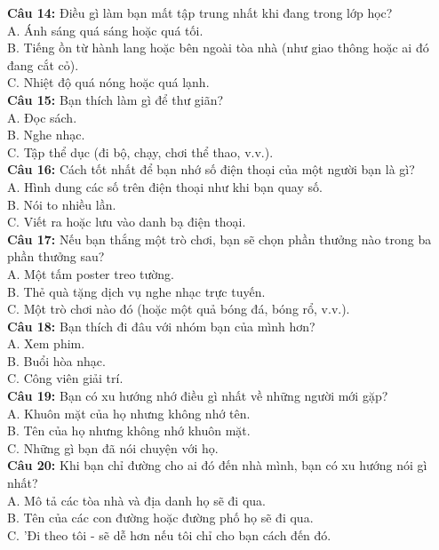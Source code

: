 \begin{multicols}{2}
\textbf{Câu 14:} Điều gì làm bạn mất tập trung nhất khi đang trong lớp học? \\
A. Ánh sáng quá sáng hoặc quá tối. \\
B. Tiếng ồn từ hành lang hoặc bên ngoài tòa nhà (như giao thông hoặc ai đó đang cắt cỏ). \\
C. Nhiệt độ quá nóng hoặc quá lạnh. \\

\textbf{Câu 15:} Bạn thích làm gì để thư giãn? \\
A. Đọc sách. \\
B. Nghe nhạc. \\
C. Tập thể dục (đi bộ, chạy, chơi thể thao, v.v.). \\

\textbf{Câu 16:} Cách tốt nhất để bạn nhớ số điện thoại của một người bạn là gì? \\
A. Hình dung các số trên điện thoại như khi bạn quay số. \\
B. Nói to nhiều lần. \\
C. Viết ra hoặc lưu vào danh bạ điện thoại. \\

\textbf{Câu 17:} Nếu bạn thắng một trò chơi, bạn sẽ chọn phần thưởng nào trong ba phần thưởng sau? \\
A. Một tấm poster treo tường. \\
B. Thẻ quà tặng dịch vụ nghe nhạc trực tuyến. \\
C. Một trò chơi nào đó (hoặc một quả bóng đá, bóng rổ, v.v.). \\

\textbf{Câu 18:} Bạn thích đi đâu với nhóm bạn của mình hơn? \\
A. Xem phim. \\
B. Buổi hòa nhạc. \\
C. Công viên giải trí. \\

\textbf{Câu 19:} Bạn có xu hướng nhớ điều gì nhất về những người mới gặp? \\
A. Khuôn mặt của họ nhưng không nhớ tên. \\
B. Tên của họ nhưng không nhớ khuôn mặt. \\
C. Những gì bạn đã nói chuyện với họ. \\

\textbf{Câu 20:} Khi bạn chỉ đường cho ai đó đến nhà mình, bạn có xu hướng nói gì nhất? \\
A. Mô tả các tòa nhà và địa danh họ sẽ đi qua. \\
B. Tên của các con đường hoặc đường phố họ sẽ đi qua. \\
C. 'Đi theo tôi - sẽ dễ hơn nếu tôi chỉ cho bạn cách đến đó.\\
\end{multicols}


